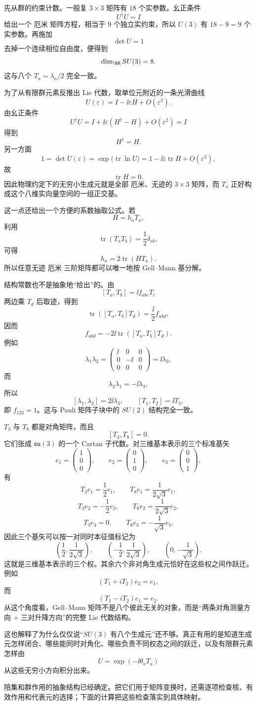 先从群的约束计数。一般复 $3\times3$ 矩阵有 $18$ 个实参数。幺正条件
\[
U^\dagger U=I
\]
给出一个 厄米 矩阵方程，相当于 $9$ 个独立实约束，所以 $U(3)$ 有 $18-9=9$ 个实参数。再施加
\[
\det U=1
\]
去掉一个连续相位自由度，便得到
\[
\dim_{\RR}SU(3)=8.
\]
这与八个 $T_a=\lambda_a/2$ 完全一致。

为了从有限群元素反推出 Lie 代数，取单位元附近的一条光滑曲线
\[
U(\varepsilon)=I-\ii\varepsilon H+O(\varepsilon^2).
\]
由幺正条件
\[
U^\dagger U
=I+\ii\varepsilon(H^\dagger-H)+O(\varepsilon^2)=I
\]
得到
\[
H^\dagger=H.
\]
另一方面
\[
1=\det U(\varepsilon)
=\exp\!\bigl(\operatorname{tr}\ln U\bigr)
=1-\ii\varepsilon\operatorname{tr}H+O(\varepsilon^2),
\]
故
\[
\operatorname{tr}H=0.
\]
因此物理约定下的无穷小生成元就是全部 厄米、无迹的 $3\times3$ 矩阵，而 $T_a$ 正好构成这个八维实向量空间的一组正交基。

这一点还给出一个方便的系数抽取公式。若
\[
H=h_aT_a,
\]
利用
\[
\operatorname{tr}(T_aT_b)=\frac12\delta_{ab},
\]
可得
\[
{
h_a=2\operatorname{tr}(HT_a)
}.
\]
所以任意无迹 厄米 三阶矩阵都可以唯一地按 Gell--Mann 基分解。

结构常数也不是抽象地“给出”的。由
\[
[T_a,T_b]=\ii f_{abc}T_c
\]
两边乘 $T_d$ 后取迹，得到
\[
\operatorname{tr}([T_a,T_b]T_d)
=\frac{\ii}{2}f_{abd},
\]
因而
\[
{
f_{abd}=-2\ii\operatorname{tr}([T_a,T_b]T_d)
}.
\]
例如
\[
\lambda_1\lambda_2
=\begin{pmatrix}\ii&0&0\\0&-\ii&0\\0&0&0\end{pmatrix}
=\ii\lambda_3,
\]
而
\[
\lambda_2\lambda_1=-\ii\lambda_3,
\]
所以
\[
[\lambda_1,\lambda_2]=2\ii\lambda_3,
\qquad
[T_1,T_2]=\ii T_3,
\]
即 $f_{123}=1$。这与 Pauli 矩阵子块中的 $SU(2)$ 结构完全一致。

$T_3$ 与 $T_8$ 都是对角矩阵，而且
\[
[T_3,T_8]=0.
\]
它们张成 $\mathfrak{su}(3)$ 的一个 Cartan 子代数。对三维基本表示的三个标准基矢
\[
e_1=\begin{pmatrix}1\\0\\0\end{pmatrix},\qquad
 e_2=\begin{pmatrix}0\\1\\0\end{pmatrix},\qquad
 e_3=\begin{pmatrix}0\\0\\1\end{pmatrix},
\]
有
\[
T_3e_1=\frac12e_1,
\qquad
T_8e_1=\frac1{2\sqrt3}e_1,
\]
\[
T_3e_2=-\frac12e_2,
\qquad
T_8e_2=\frac1{2\sqrt3}e_2,
\]
\[
T_3e_3=0,
\qquad
T_8e_3=-\frac1{\sqrt3}e_3.
\]
因此三个基矢可以按一对同时本征值标记为
\[
\left(\frac12,\frac1{2\sqrt3}\right),\qquad
\left(-\frac12,\frac1{2\sqrt3}\right),\qquad
\left(0,-\frac1{\sqrt3}\right).
\]
这就是三维基本表示的三个权。其余六个非对角生成元恰好在这些权之间作跃迁。例如
\[
(T_1+iT_2)e_2=e_1,
\]
而
\[
(T_1-iT_2)e_1=e_2.
\]
从这个角度看，Gell--Mann 矩阵不是八个彼此无关的对象，而是“两条对角测量方向 + 三对升降方向”的完整 Lie 代数结构。

这也解释了为什么仅仅说“$SU(3)$ 有八个生成元”还不够。真正有用的是知道生成元怎样闭合、哪些能同时对角化、哪些负责不同权态之间的跃迁，以及有限群元素怎样由
\[
U=\exp(-\ii\theta_aT_a)
\]
从这些无穷小方向积分出来。


陪集和群作用的抽象结构已经确定。把它们用于矩阵变换时，还需逐项检查核、有效作用和代表元的选择；下面的计算把这些检查落实到具体映射。




